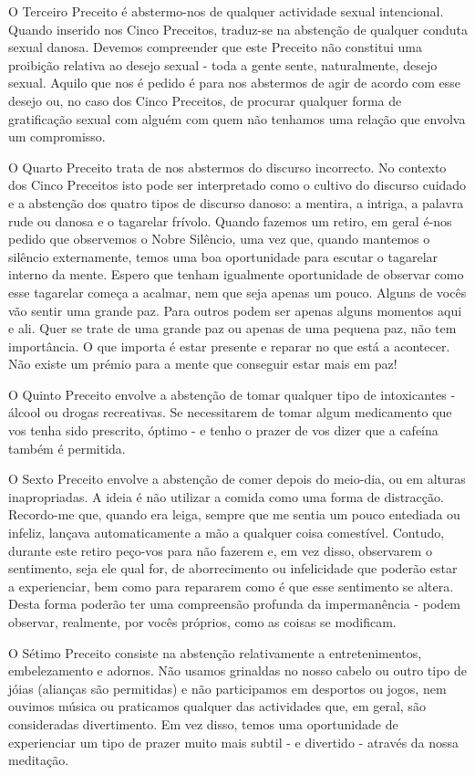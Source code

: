 O Terceiro Preceito é abstermo-nos de qualquer actividade sexual
intencional. Quando inserido nos Cinco Preceitos, traduz-se na abstenção
de qualquer conduta sexual danosa. Devemos compreender que este Preceito
não constitui uma proibição relativa ao desejo sexual - toda a gente
sente, naturalmente, desejo sexual. Aquilo que nos é pedido é para nos
abstermos de agir de acordo com esse desejo ou, no caso dos Cinco
Preceitos, de procurar qualquer forma de gratificação sexual com alguém
com quem não tenhamos uma relação que envolva um compromisso.

O Quarto Preceito trata de nos abstermos do discurso incorrecto. No
contexto dos Cinco Preceitos isto pode ser interpretado como o cultivo
do discurso cuidado e a abstenção dos quatro tipos de discurso danoso: a
mentira, a intriga, a palavra rude ou danosa e o tagarelar frívolo.
Quando fazemos um retiro, em geral é-nos pedido que observemos o Nobre
Silêncio, uma vez que, quando mantemos o silêncio externamente, temos
uma boa oportunidade para escutar o tagarelar interno da mente. Espero
que tenham igualmente oportunidade de observar como esse tagarelar
começa a acalmar, nem que seja apenas um pouco. Alguns de vocês vão
sentir uma grande paz. Para outros podem ser apenas alguns momentos aqui
e ali. Quer se trate de uma grande paz ou apenas de uma pequena paz, não
tem importância. O que importa é estar presente e reparar no que está a
acontecer. Não existe um prémio para a mente que conseguir estar mais em
paz!

O Quinto Preceito envolve a abstenção de tomar qualquer tipo de
intoxicantes - álcool ou drogas recreativas. Se necessitarem de tomar
algum medicamento que vos tenha sido prescrito, óptimo - e tenho o
prazer de vos dizer que a cafeína também é permitida.

O Sexto Preceito envolve a abstenção de comer depois do meio-dia, ou em
alturas inapropriadas. A ideia é não utilizar a comida como uma forma de
distracção. Recordo-me que, quando era leiga, sempre que me sentia um
pouco entediada ou infeliz, lançava automaticamente a mão a qualquer
coisa comestível. Contudo, durante este retiro peço-vos para não fazerem
e, em vez disso, observarem o sentimento, seja ele qual for, de
aborrecimento ou infelicidade que poderão estar a experienciar, bem como
para repararem como é que esse sentimento se altera. Desta forma poderão
ter uma compreensão profunda da impermanência - podem observar,
realmente, por vocês próprios, como as coisas se modificam.

O Sétimo Preceito consiste na abstenção relativamente a entretenimentos,
embelezamento e adornos. Não usamos grinaldas no nosso cabelo ou outro
tipo de jóias (alianças são permitidas) e não participamos em desportos
ou jogos, nem ouvimos música ou praticamos qualquer das actividades que,
em geral, são consideradas divertimento. Em vez disso, temos uma
oportunidade de experienciar um tipo de prazer muito mais subtil - e
divertido - através da nossa meditação.

